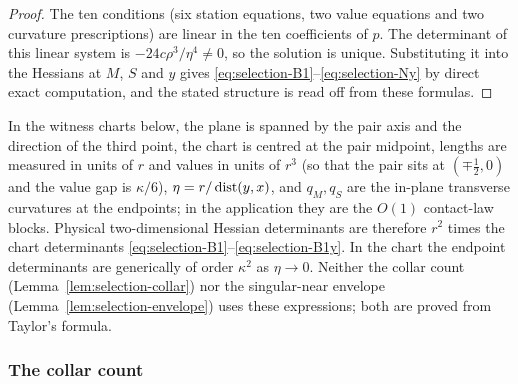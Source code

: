 \begin{proof}
The ten conditions (six station equations, two value equations and two curvature prescriptions) are linear in the ten coefficients of $p$. The determinant of this linear system is $-24c\rho^3/\eta^4\ne0$, so the solution is unique. Substituting it into the Hessians at $M$, $S$ and $y$ gives \eqref{eq:selection-B1}--\eqref{eq:selection-Ny} by direct exact computation, and the stated structure is read off from these formulas.
\end{proof}

In the witness charts below, the plane is spanned by the pair axis and the direction of the third point, the chart is centred at the pair midpoint, lengths are measured in units of $r$ and values in units of $r^3$ (so that the pair sits at $(\mp\frac12,0)$ and the value gap is $\kappa/6$), $\eta=r/\operatorname{dist}(y,x)$, and $q_M,q_S$ are the in-plane transverse curvatures at the endpoints; in the application they are the $O(1)$ contact-law blocks. Physical two-dimensional Hessian determinants are therefore $r^2$ times the chart determinants \eqref{eq:selection-B1}--\eqref{eq:selection-B1y}. In the chart the endpoint determinants are generically of order $\kappa^2$ as $\eta\to0$. Neither the collar count (Lemma~\ref{lem:selection-collar}) nor the singular-near envelope (Lemma~\ref{lem:selection-envelope}) uses these expressions; both are proved from Taylor's formula.

\subsubsection{The collar count}

